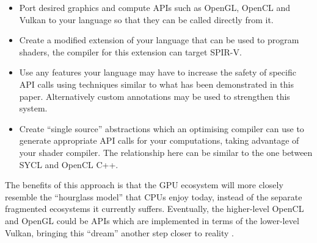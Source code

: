 \documentclass[a4paper,12pt,twoside,openright]{report}
\begin{document}
\begin{itemize}

    \item Port desired graphics and compute APIs such as OpenGL, OpenCL and
    Vulkan to your language so that they can be called directly from it.

    \item Create a modified extension of your language that can be used to
    program shaders, the compiler for this extension can target SPIR-V.

    \item Use any features your language may have to increase the safety of
    specific API calls using techniques similar to what has been demonstrated
    in this paper. Alternatively custom annotations may be used to strengthen
    this system.

    \item Create ``single source'' abstractions which an optimising compiler
    can use to generate appropriate API calls for your computations, taking
    advantage of your shader compiler. The relationship here can be similar to
    the one between SYCL and OpenCL C++.

\end{itemize}

The benefits of this approach is that the GPU ecosystem will more closely
resemble the ``hourglass model'' that CPUs enjoy today, instead of the separate
fragmented ecosystems it currently suffers. Eventually, the higher-level OpenCL
and OpenGL could be APIs which are implemented in terms of the lower-level
Vulkan, bringing this ``dream'' another step closer to reality
\cite{OpenGLonVulkan} \cite{VulkanOpenCLMerge} \cite{OpenGLOverload}.





\singlespacing
\end{document}
